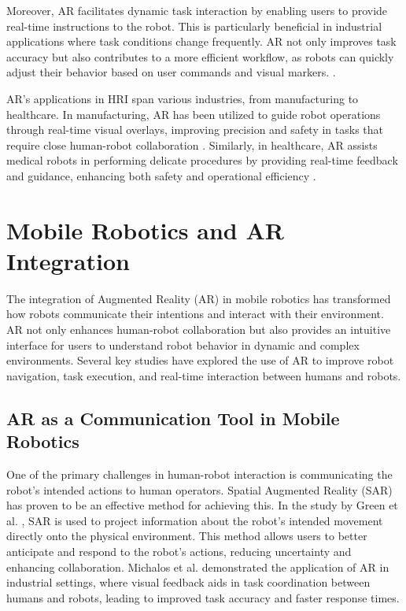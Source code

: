 Moreover, AR facilitates dynamic task interaction by enabling users to provide real-time instructions to the robot. This is particularly beneficial in industrial applications where task conditions change frequently. AR not only improves task accuracy but also contributes to a more efficient workflow, as robots can quickly adjust their behavior based on user commands and visual markers. \cite{Suzuki2022}.

AR's applications in HRI span various industries, from manufacturing to healthcare. In manufacturing, AR has been utilized to guide robot operations through real-time visual overlays, improving precision and safety in tasks that require close human-robot collaboration \cite{Hentout2019}. Similarly, in healthcare, AR assists medical robots in performing delicate procedures by providing real-time feedback and guidance, enhancing both safety and operational efficiency \cite{Suzuki2022}. 

\section{Mobile Robotics and AR Integration}

The integration of Augmented Reality (AR) in mobile robotics has transformed how robots communicate their intentions and interact with their environment. AR not only enhances human-robot collaboration but also provides an intuitive interface for users to understand robot behavior in dynamic and complex environments. Several key studies have explored the use of AR to improve robot navigation, task execution, and real-time interaction between humans and robots.

\subsection{AR as a Communication Tool in Mobile Robotics}

One of the primary challenges in human-robot interaction is communicating the robot’s intended actions to human operators. Spatial Augmented Reality (SAR) has proven to be an effective method for achieving this. In the study by Green et al. \cite{Green2019}, SAR is used to project information about the robot’s intended movement directly onto the physical environment. This method allows users to better anticipate and respond to the robot’s actions, reducing uncertainty and enhancing collaboration. Michalos et al. \cite{Michalos2022} demonstrated the application of AR in industrial settings, where visual feedback aids in task coordination between humans and robots, leading to improved task accuracy and faster response times.

